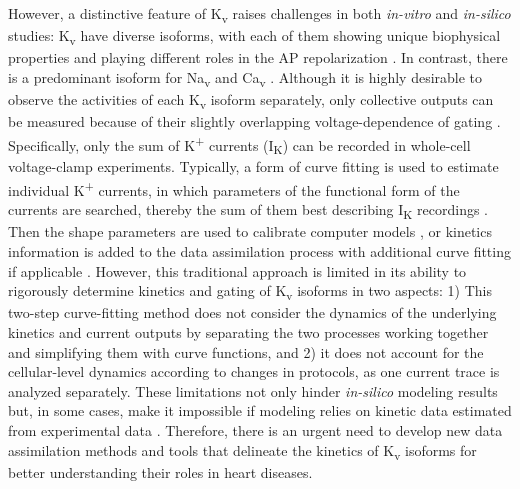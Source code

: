 \documentclass[11pt]{article}
\begin{document}
However, a distinctive feature of K\textsubscript{v} raises challenges in both \textit{in-vitro} and \textit{in-silico} studies: K\textsubscript{v} have diverse isoforms, with each of them showing unique biophysical properties and playing different roles in the AP repolarization \citep{nerbonne2005molecular}. In contrast, there is a predominant isoform for Na\textsubscript{v} and Ca\textsubscript{v} \citep{abriel2010cardiac,benitah2010type}. Although it is highly desirable to observe the activities of each K\textsubscript{v} isoform separately, only collective outputs can be measured because of their slightly overlapping voltage-dependence of gating \citep{brouillette2004functional}. Specifically, only the sum of K\textsuperscript{+} currents (I\textsubscript{K}) can be recorded in whole-cell voltage-clamp experiments. Typically, a form of curve fitting is used to estimate individual K\textsuperscript{+} currents, in which parameters of the functional form of the currents are searched, thereby the sum of them best describing I\textsubscript{K} recordings \citep{brunet2004heterogeneous}. Then the shape parameters are used to calibrate computer models \citep{kim2022simulation}, or kinetics information is added to the data assimilation process with additional curve fitting if applicable \citep{du2017silico}. However, this traditional approach is limited in its ability to rigorously determine kinetics and gating of K\textsubscript{v} isoforms in two aspects: 1) This two-step curve-fitting method does not consider the dynamics of the underlying kinetics and current outputs by separating the two processes working together and simplifying them with curve functions, and 2) it does not account for the cellular-level dynamics according to changes in protocols, as one current trace is analyzed separately. These limitations not only hinder \textit{in-silico} modeling results but, in some cases, make it impossible if modeling relies on kinetic data estimated from experimental data \citep{kim2022simulation}. Therefore, there is an urgent need to develop new data assimilation methods and tools that delineate the kinetics of K\textsubscript{v} isoforms for better understanding their roles in heart diseases. 
\end{document}
